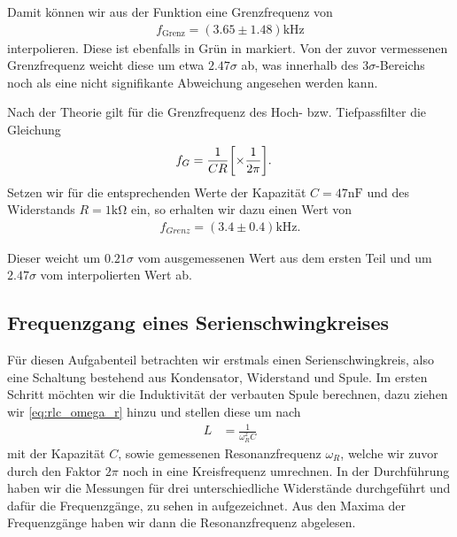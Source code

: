 Damit können wir aus der Funktion eine Grenzfrequenz von
\begin{align}
  f_{\mathrm{Grenz}} = (3.65 \pm 1.48) \si{\kilo\hertz}
\end{align}
interpolieren. Diese ist ebenfalls in Grün in  markiert. Von der zuvor vermessenen Grenzfrequenz weicht diese um etwa $2.47\sigma$ ab, was innerhalb des $3\sigma$-Bereichs noch als eine nicht signifikante Abweichung angesehen werden kann.

Nach der Theorie gilt für die Grenzfrequenz des Hoch- bzw. Tiefpassfilter die Gleichung
\begin{align}
  f_G &= \frac{1}{CR} \qty[\times \frac{1}{2 \pi}].
\end{align}
Setzen wir für die entsprechenden Werte der Kapazität $C = 47\si{\nano\farad}$ und des Widerstands $R = 1\si{\kilo\ohm}$ ein, so erhalten wir dazu einen Wert von
\begin{align}
  f_{Grenz} = (3.4 \pm 0.4)\si{\kilo\hertz}.
\end{align}

Dieser weicht um $0.21\sigma$ vom ausgemessenen Wert aus dem ersten Teil und um $2.47\sigma$ vom interpolierten Wert ab.

\subsection{Frequenzgang eines Serienschwingkreises}

Für diesen Aufgabenteil betrachten wir erstmals einen Serienschwingkreis, also eine Schaltung bestehend aus Kondensator, Widerstand und Spule. Im ersten Schritt möchten wir die Induktivität der verbauten Spule berechnen, dazu ziehen wir \eqref{eq:rlc_omega_r} hinzu und stellen diese um nach
\begin{align}
  L &= \frac{1}{\omega_R^2 C}
\end{align}
mit der Kapazität $C$, sowie gemessenen Resonanzfrequenz $\omega_R$, welche wir zuvor durch den Faktor $2\pi$ noch in eine Kreisfrequenz umrechnen. In der Durchführung haben wir die Messungen für drei unterschiedliche Widerstände durchgeführt und dafür die Frequenzgänge, zu sehen in  aufgezeichnet. Aus den Maxima der Frequenzgänge haben wir dann die Resonanzfrequenz abgelesen.

